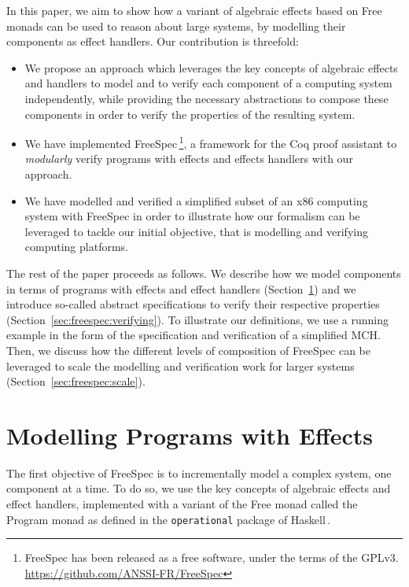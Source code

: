 In this paper, we aim to show how a variant of algebraic effects based on Free
monads can be used to reason about large systems, by modelling their components
as effect handlers.
%
Our contribution is threefold:
\begin{itemize}
\item We propose an approach which leverages the key concepts of
algebraic effects and handlers to model and to verify each component of a computing
system independently, while providing the necessary abstractions to compose
these components in order to verify the properties of the resulting system.
\item We have implemented FreeSpec\,\footnote{FreeSpec has been released as a
free software, under the terms of the GPLv3.
\url{https://github.com/ANSSI-FR/FreeSpec}}, a framework for the Coq proof
assistant to \emph{modularly} verify programs with effects and
effects handlers with our approach.
\item We have modelled and verified a simplified subset of an x86 computing
system with FreeSpec in order to illustrate how our formalism can be leveraged
to tackle our initial objective, that is modelling and verifying computing
platforms.
\end{itemize}

The rest of the paper proceeds as follows.
%
We describe how we model components in terms of programs with effects and effect
handlers (Section~\ref{sec:freespec:specifying}) and we introduce so-called abstract
specifications to verify their respective properties
(Section~\ref{sec:freespec:verifying}).
%
To illustrate our definitions, we use a running example in the form of the
specification and verification of a simplified MCH.
%
Then, we discuss how the different levels of composition of FreeSpec can be
leveraged to scale the modelling and verification work for larger systems
(Section~\ref{sec:freespec:scale}).

\section{Modelling Programs with Effects}
\label{sec:freespec:specifying}

The first objective of FreeSpec is to incrementally model a complex system,
one component at a time.
%
To do so, we use the key concepts of algebraic effects and effect handlers,
implemented with a variant of the Free monad called the Program monad as defined
in the \texttt{operational} package of Haskell\,\cite{operational}.

